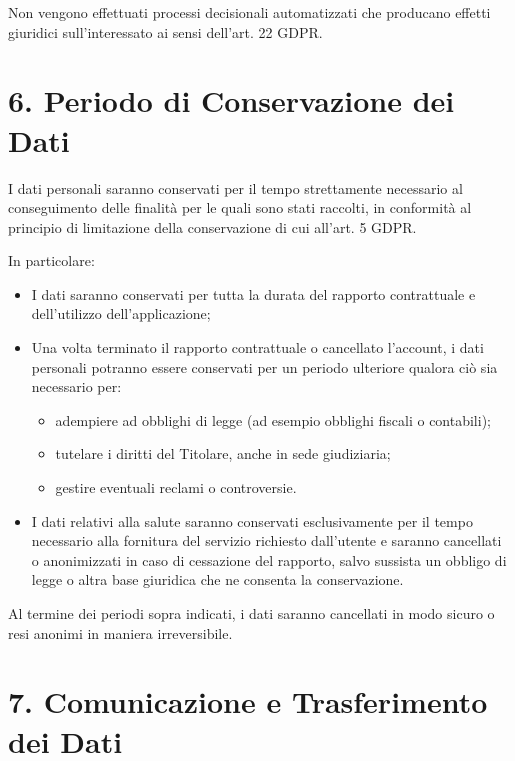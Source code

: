 \documentclass[a4paper,12pt]{article}
\begin{document}
    Non vengono effettuati processi decisionali automatizzati che producano effetti giuridici sull’interessato ai sensi dell’art. 22 GDPR.

    \section*{6. Periodo di Conservazione dei Dati}

    I dati personali saranno conservati per il tempo strettamente necessario al conseguimento delle finalità per le quali sono stati raccolti, in conformità al principio di limitazione della conservazione di cui all’art. 5 GDPR.

    In particolare:

    \begin{itemize}
        \item I dati saranno conservati per tutta la durata del rapporto contrattuale e dell’utilizzo dell’applicazione;

        \item Una volta terminato il rapporto contrattuale o cancellato l’account, i dati personali potranno essere conservati per un periodo ulteriore qualora ciò sia necessario per:
        \begin{itemize}
            \item adempiere ad obblighi di legge (ad esempio obblighi fiscali o contabili);
            \item tutelare i diritti del Titolare, anche in sede giudiziaria;
            \item gestire eventuali reclami o controversie.
        \end{itemize}

        \item I dati relativi alla salute saranno conservati esclusivamente per il tempo necessario alla fornitura del servizio richiesto dall’utente e saranno cancellati o anonimizzati in caso di cessazione del rapporto, salvo sussista un obbligo di legge o altra base giuridica che ne consenta la conservazione.
    \end{itemize}

    Al termine dei periodi sopra indicati, i dati saranno cancellati in modo sicuro o resi anonimi in maniera irreversibile.

    \section*{7. Comunicazione e Trasferimento dei Dati}
\end{document}
